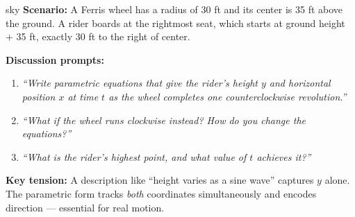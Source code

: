 \documentclass[10pt]{article}
\begin{document}
\vspace{0.08in}

\begin{skillbox}{sky}
\textbf{Scenario:} A Ferris wheel has a radius of 30 ft and its center
is 35 ft above the ground. A rider boards at the rightmost seat, which
starts at ground height $+$ 35 ft, exactly 30 ft to the right of center.

\textbf{Discussion prompts:}
\begin{enumerate}[leftmargin=1.4em, itemsep=3pt]
  \item \textit{``Write parametric equations that give the rider's height
    $y$ and horizontal position $x$ at time $t$ as the wheel completes
    one counterclockwise revolution.''}
  \item \textit{``What if the wheel runs clockwise instead? How do you
    change the equations?''}
  \item \textit{``What is the rider's highest point, and what value of $t$
    achieves it?''}
\end{enumerate}

\textbf{Key tension:} A description like ``height varies as a sine wave''
captures $y$ alone. The parametric form tracks \emph{both} coordinates
simultaneously and encodes direction --- essential for real motion.
\end{skillbox}

\vspace{0.08in}
\end{document}
